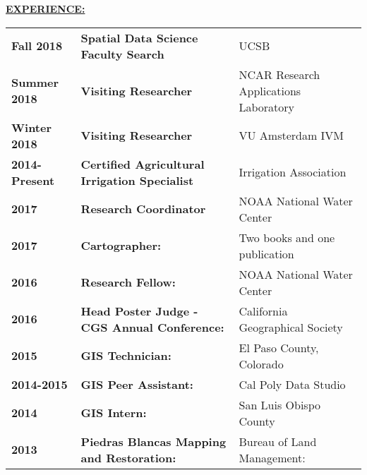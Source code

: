 \documentclass{article}
\newcommand{\header}[1]{\hspace{-5mm}\textcolor{header_blue}{\underline{\textbf{#1}}\\}} %
\begin{document}
\header{EXPERIENCE:}
\newline
\vspace{5mm}
\begin{tabular}{p{2.5cm}p{8.0cm}l}
  \textbf{Fall 2018 } & \textbf{Spatial Data Science Faculty Search } & UCSB \\ 
  \textbf{Summer 2018 } & \textbf{Visiting Researcher } & NCAR Research Applications Laboratory \\ 
  \textbf{Winter 2018 } & \textbf{Visiting Researcher } & VU Amsterdam IVM \\ 
  \textbf{2014-Present } & \textbf{Certified Agricultural Irrigation Specialist } & Irrigation Association \\ 
  \textbf{2017 } & \textbf{Research Coordinator } & NOAA National Water Center \\ 
  \textbf{2017 } & \textbf{Cartographer: } & Two books and one publication \\ 
  \textbf{2016 } & \textbf{Research Fellow: } & NOAA National Water Center \\ 
  \textbf{2016 } & \textbf{Head Poster Judge - CGS Annual Conference: } & California Geographical Society \\ 
  \textbf{2015 } & \textbf{GIS Technician: } & El Paso County, Colorado \\ 
  \textbf{2014-2015 } & \textbf{GIS Peer Assistant: } & Cal Poly Data Studio \\ 
  \textbf{2014 } & \textbf{GIS Intern: } & San Luis Obispo County \\ 
  \textbf{2013 } & \textbf{Piedras Blancas Mapping and Restoration: } & Bureau of Land Management: \\ 
  \end{tabular}\clearpage
\end{document}
